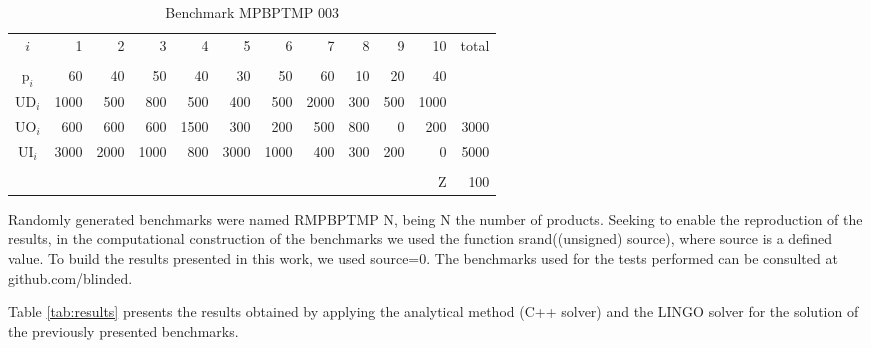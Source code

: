 \documentclass[authoryear,preprint,12pt]{elsarticle}
\begin{document}
\begin{table}[h]
\begin{center}
\begin{small}
\begin{tabular}[c]{c r r r r r r r r r r r }
$i$ & 1 & 2 & 3 & 4 & 5 & 6 & 7 & 8 & 9 & 10 & total \\
\cline {1-12} \\
$\textrm{p}_i$ & 60 & 40 & 50 & 40 & 30 & 50 & 60 & 10 & 20 & 40\\
$\textrm{UD}_i$ & 1000 & 500 & 800 & 500 & 400 & 500 & 2000 & 300 & 500 & 1000 \\
$\textrm{UO}_i$ & 600 & 600 & 600 & 1500 & 300 & 200 & 500 & 800 & 0 & 200 & 3000 \\
$\textrm{UI}_i$ & 3000 & 2000 & 1000 & 800 & 3000 & 1000 & 400 & 300 & 200 & 0 & 5000 \\
\cline {1-12} \\
& & & & & & & & & & $\textrm{Z}$ & 100 \\
\end{tabular}
\caption{Benchmark MPBPTMP 003}
\label{tab:MBPTMP003}
\end{small}
\end{center}
\end{table}

Randomly generated benchmarks were named RMPBPTMP $\textrm{N}$, being $\textrm{N}$ the number of products. Seeking to enable the reproduction of the results, in the computational construction of the benchmarks we used the function srand((unsigned) source), where source is a defined value. To build the results presented in this work, we used source=0. The benchmarks used for the tests performed can be consulted at github.com/blinded.

Table \ref{tab:results} presents the results obtained by applying the analytical method (C++ solver) and the LINGO solver for the solution of the previously presented benchmarks.
\end{document}
